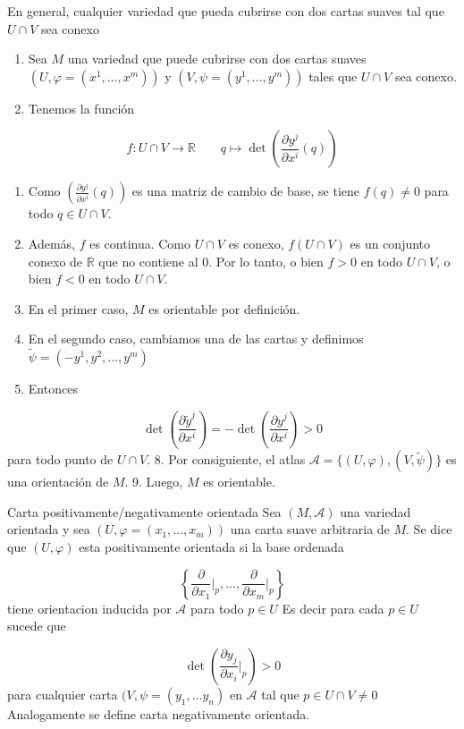 \begin{bookproposition}{}
En general, cualquier variedad que pueda cubrirse con dos cartas suaves tal que $U\cap V$ sea conexo

\end{bookproposition}
\begin{bookproof}{}
\begin{enumerate}
\item Sea $M$ una variedad que puede cubrirse con dos cartas suaves $(U,\varphi=(x^1,\ldots,x^m))$ y $(V,\psi=(y^1,\ldots,y^m))$ tales que $U\cap V$ sea conexo.
\item Tenemos la función
\end{enumerate}
\[
f:U\cap V\to\mathbb R \qquad q\mapsto\det\!\left(\frac{\partial y^j}{\partial x^i}(q)\right)
\]
\begin{enumerate}[start=3]
\item Como $\left(\frac{\partial y^j}{\partial x^i}(q)\right)$ es una matriz de cambio de base, se tiene $f(q)\neq0$ para todo $q\in U\cap V$.
\item Además, $f$ es continua. Como $U\cap V$ es conexo, $f(U\cap V)$ es un conjunto conexo de $\mathbb R$ que no contiene al $0$. Por lo tanto, o bien $f>0$ en todo $U\cap V$, o bien $f<0$ en todo $U\cap V$.
\item En el primer caso, $M$ es orientable por definición.
\item En el segundo caso, cambiamos una de las cartas y definimos $\tilde\psi=(-y^1,y^2,\ldots,y^m)$
\item Entonces
\end{enumerate}
\[
\det\!\left(\frac{\partial\tilde y^j}{\partial x^i}\right)=-\det\!\left(\frac{\partial y^j}{\partial x^i}\right)>0
\]
para todo punto de $U\cap V$. 8. Por consiguiente, el atlas $\mathcal A=\{(U,\varphi),(V,\tilde\psi)\}$ es una orientación de $M$. 9. Luego, $M$ es orientable.

\bookqed
\end{bookproof}
\begin{bookdefinition}{Carta positivamente/negativamente orientada}
Sea $(M, \mathcal{A})$ una variedad orientada y sea $(U,\varphi=(x_1,\ldots,x_m))$ una carta suave arbitraria de $M$. Se dice que $(U,\varphi)$ esta positivamente orientada si la base ordenada

\[
\left\{\frac{\partial}{\partial x_1}\bigg|_p,\ldots,\frac{\partial}{\partial x_m}\bigg|_p\right\}
\]
tiene orientacion inducida por $\mathcal A$ para todo $p\in U$ Es decir para cada $p\in U$ sucede que

\[
\det\left(\frac{\partial y_j}{\partial x_i}\bigg|_{p}\right)>0
\]
para cualquier carta $(V,\psi=(y_{1},\ldots y_{n})$ en $\mathcal A$ tal que $p\in U\cap V\neq 0$ Analogamente se define carta negativamente orientada.

\end{bookdefinition}
